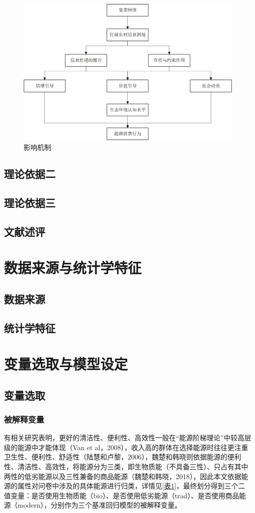 \documentclass[a4paper, 12pt, oneside]{article} %
\begin{document}
	~\
	\begin{figure}[htbp]
		\centering
		\includegraphics[width = 1\textwidth]{影响机制.jpg}
		{\heiti {} \caption{影响机制}}
	\end{figure}
	\subsection{理论依据二}
	\subsection{理论依据三}
	\subsection{文献述评}
	\section{数据来源与统计学特征}
	\subsection{数据来源}
	\subsection{统计学特征}
	\section{变量选取与模型设定}
	\subsection{变量选取}
	\subsubsection{被解释变量}
	有相关研究表明，更好的清洁性、便利性、高效性一般在“能源阶梯理论”中较高层级的能源中才能体现（Van et al，2008），收入高的群体在选择能源时往往更注重卫生性、便利性、舒适性（陆慧和卢黎，2006），魏楚和韩晓则依据能源的便利性、清洁性、高效性，将能源分为三类，即生物质能（不具备三性）、只占有其中两性的低劣能源以及三性兼备的商品能源（魏楚和韩晓，2018），因此本文依据能源的属性对问卷中涉及的具体能源进行归类，详情见\ref{表1}，最终划分得到三个二值变量：是否使用生物质能（bio）、是否使用低劣能源（trad）、是否使用商品能源（modern），分别作为三个基准回归模型的被解释变量。
	
\end{document}
